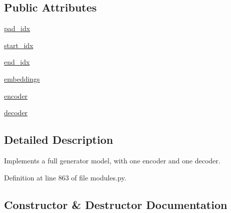 \subsection*{Public Attributes}
\begin{DoxyCompactItemize}
\item 
\hyperlink{classparlai_1_1agents_1_1transformer_1_1modules_1_1TransformerGeneratorModel_aefac02b3630ef361bb008b4f7973c55b}{pad\+\_\+idx}
\item 
\hyperlink{classparlai_1_1agents_1_1transformer_1_1modules_1_1TransformerGeneratorModel_a381b6d63e5aba194730c36d9fb93c6d6}{start\+\_\+idx}
\item 
\hyperlink{classparlai_1_1agents_1_1transformer_1_1modules_1_1TransformerGeneratorModel_ab2b8403205fcd407e47546dc56022d2f}{end\+\_\+idx}
\item 
\hyperlink{classparlai_1_1agents_1_1transformer_1_1modules_1_1TransformerGeneratorModel_a18411754103e8c8f4cd2e9338351b98d}{embeddings}
\item 
\hyperlink{classparlai_1_1agents_1_1transformer_1_1modules_1_1TransformerGeneratorModel_af165b8ec1505f768c530aea02d68ae09}{encoder}
\item 
\hyperlink{classparlai_1_1agents_1_1transformer_1_1modules_1_1TransformerGeneratorModel_a6467f0fdec226329cb8efe77245996a5}{decoder}
\end{DoxyCompactItemize}


\subsection{Detailed Description}
\begin{DoxyVerb}Implements a full generator model, with one encoder and one decoder.
\end{DoxyVerb}
 

Definition at line 863 of file modules.\+py.



\subsection{Constructor \& Destructor Documentation}
\mbox{\label{classparlai_1_1agents_1_1transformer_1_1modules_1_1TransformerGeneratorModel_a17276e3090a132914c0adae133e60357}} 
